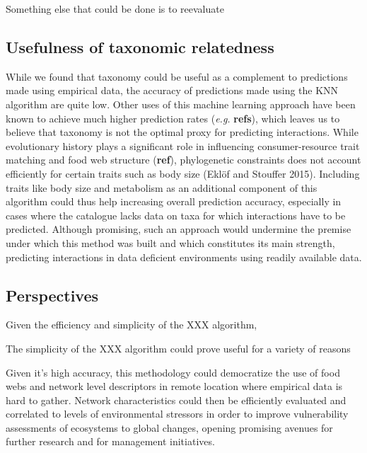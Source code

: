 \documentclass[letterpaper]{article}
\begin{document}
Something else that could be done is to reevaluate




\subsection{Usefulness of taxonomic relatedness}
 While we found that taxonomy could be useful as a complement to predictions made using empirical data, the accuracy of predictions made using the KNN algorithm are quite low. Other uses of this machine learning approach have been known to achieve much higher prediction rates (\textit{e.g.} \textbf{refs}), which leaves us to believe that taxonomy is not the optimal proxy for predicting interactions. While evolutionary history plays a significant role in influencing consumer-resource trait matching and food web structure (\textbf{ref}), phylogenetic constraints does not account efficiently for certain traits such as body size (Eklöf and Stouffer 2015). Including traits like body size and metabolism as an additional component of this algorithm could thus help increasing overall prediction accuracy, especially in cases where the catalogue lacks data on taxa for which interactions have to be predicted. Although promising, such an approach would undermine the premise under which this method was built and which constitutes its main strength, predicting interactions in data deficient environments using readily available data.





\subsection{Perspectives}
Given the efficiency and simplicity of the XXX algorithm,

The simplicity of the XXX algorithm could prove useful for a variety of reasons



Given it’s high accuracy, this methodology could democratize the use of food webs and network level descriptors in remote location where empirical data is hard to gather. Network characteristics could then be efficiently evaluated and correlated to levels of environmental stressors in order to improve vulnerability assessments of ecosystems to global changes, opening promising avenues for further research and for management initiatives.
\end{document}
